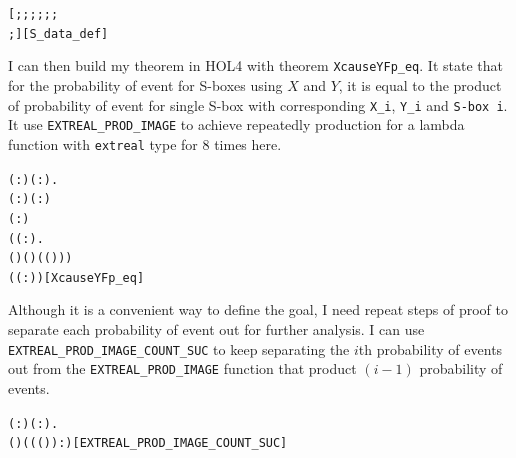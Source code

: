 \documentclass{article}
\begin{document}
\begin{alltt}
\HOLTokenTurnstile{}  \HOLSymConst{=}
   [; ; ; ; ; ;
    ; ]\hfill{[S_data_def]}
\end{alltt}

I can then build my theorem in HOL4 with theorem \verb|XcauseYFp_eq|. It state that for the probability of event for S-boxes using $X$ and
$Y$, it is equal to the product of probability of event for single S-box with corresponding \verb|X_i|, \verb|Y_i| and \verb|S-box i|. It
use \verb|EXTREAL_PROD_IMAGE| to achieve repeatedly production for a lambda function with \verb|extreal| type for $8$ times here.

\begin{alltt}
\HOLTokenTurnstile{} \HOLSymConst{\HOLTokenForall{}}( :) ( :).
     ( :) \HOLSymConst{=}   \HOLSymConst{\HOLTokenConj{}} ( : ) \HOLSymConst{=}   \HOLSymConst{\HOLTokenConj{}}
     ( : ) \HOLSymConst{=}   \HOLSymConst{\HOLTokenImp{}}
        \HOLSymConst{=}
     \HOLSymConst{\HOLTokenPI{}}
       (\HOLTokenLambda{}( :).
             (  ) (  ) ( (  )))
       ( ( :))\hfill{[XcauseYFp_eq]}
\end{alltt}

Although it is a convenient way to define the goal, I need repeat steps of proof to separate each probability of event out
for further analysis. I can use \verb|EXTREAL_PROD_IMAGE_COUNT_SUC| to keep separating the $i$th probability of events out from the
\verb|EXTREAL_PROD_IMAGE| function that product $(i-1)$ probability of events.

\begin{alltt}
\HOLTokenTurnstile{} \HOLSymConst{\HOLTokenForall{}}( : \HOLTokenMap{} ) ( :).
     \HOLSymConst{\HOLTokenPI{}}  ( ) \HOLSymConst{=} ((\HOLSymConst{\HOLTokenPI{}}  ( ) \HOLSymConst{\HOLTokenProd{}}  ) :)\hfill{[EXTREAL_PROD_IMAGE_COUNT_SUC]}
\end{alltt}
\end{document}
